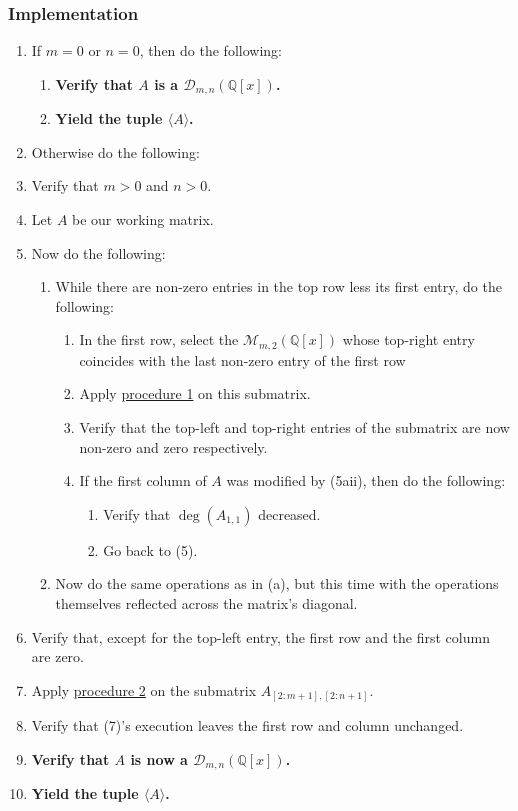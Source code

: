 \documentclass[twocolumn]{article}
\begin{document}
			\subsubsection{Implementation}
				\begin{enumerate}
					\item If $m=0$ or $n=0$, then do the following:
					\begin{enumerate}
						\item \textbf{Verify that $A$ is a $\mathcal{D}_{m,n}(\mathbb{Q}[x])$.}
						\item \textbf{Yield the tuple $\langle A\rangle$.}
					\end{enumerate}
					\item Otherwise do the following:
					\item Verify that $m>0$ and $n>0$.
					\item Let $A$ be our working matrix.
					\item Now do the following:
						\begin{enumerate}
						\item While there are non-zero entries in the top row less its first entry, do the following:
						\begin{enumerate}
							\item In the first row, select the $\mathcal{M}_{m,2}(\mathbb{Q}[x])$ whose top-right entry coincides with the last non-zero entry of the first row
							\item Apply \hyperref[sec:procedure 1]{procedure 1} on this submatrix.
							\item Verify that the top-left and top-right entries of the submatrix are now non-zero and zero respectively.
							\item If the first column of $A$ was modified by (5aii), then do the following:
							\begin{enumerate}
								\item Verify that $\deg(A_{1,1})$ decreased.
								\item Go back to (5).
							\end{enumerate}
						\end{enumerate}
						\item Now do the same operations as in (a), but this time with the operations themselves reflected across the matrix's diagonal.
					\end{enumerate}
					\item Verify that, except for the top-left entry, the first row and the first column are zero.
					\item Apply \hyperref[sec:procedure 2]{procedure 2} on the submatrix $A_{[2:m+1],[2:n+1]}$.
					\item Verify that (7)'s execution leaves the first row and column unchanged.
					\item \textbf{Verify that $A$ is now a $\mathcal{D}_{m,n}(\mathbb{Q}[x])$.}
					\item \textbf{Yield the tuple $\langle A\rangle$.}
				\end{enumerate}
\end{document}
